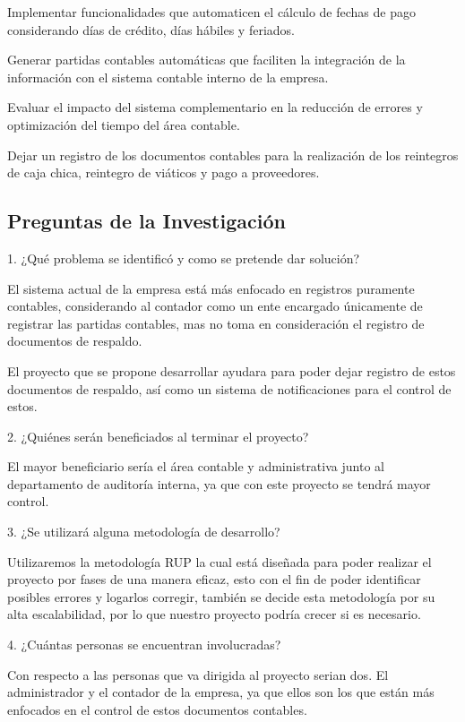 Implementar funcionalidades que automaticen el cálculo de fechas de pago considerando días de crédito, días hábiles y feriados.

Generar partidas contables automáticas que faciliten la integración de la información con el sistema contable interno de la empresa.

Evaluar el impacto del sistema complementario en la reducción de errores y optimización del tiempo del área contable.

Dejar un registro de los documentos contables para la realización de los reintegros de caja chica, reintegro de viáticos y pago a proveedores.

\subsection{Preguntas de la Investigación}

1. ¿Qué problema se identificó y como se pretende dar solución?

El sistema actual de la empresa está más enfocado en registros puramente contables, considerando al contador como un ente encargado únicamente de registrar las partidas contables, mas no toma en consideración el registro de documentos de respaldo.

El proyecto que se propone desarrollar ayudara para poder dejar registro de estos documentos de respaldo, así como un sistema de notificaciones para el control de estos.

2. ¿Quiénes serán beneficiados al terminar el proyecto?

El mayor beneficiario sería el área contable y administrativa junto al departamento de auditoría interna, ya que con este proyecto se tendrá mayor control.

3. ¿Se utilizará alguna metodología de desarrollo?

Utilizaremos la metodología RUP la cual está diseñada para poder realizar el proyecto por fases de una manera eficaz, esto con el fin de poder identificar posibles errores y logarlos corregir, también se decide esta metodología por su alta escalabilidad, por lo que nuestro proyecto podría crecer si es necesario.

4. ¿Cuántas personas se encuentran involucradas?

Con respecto a las personas que va dirigida al proyecto serian dos. El administrador y el contador de la empresa, ya que ellos son los que están más enfocados en el control de estos documentos contables.

